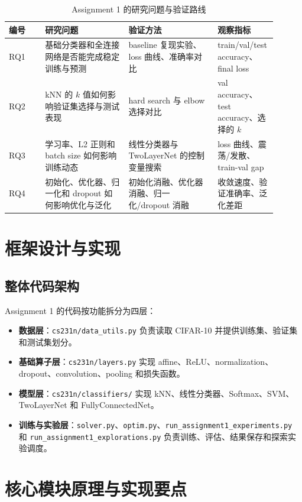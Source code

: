 \documentclass[UTF8]{ctexart}
\begin{document}
\begin{table}[H]
\centering
\begin{tabular}{p{0.13\linewidth}p{0.30\linewidth}p{0.32\linewidth}p{0.15\linewidth}}
\toprule
编号 & 研究问题 & 验证方法 & 观察指标 \\
\midrule
RQ1 & 基础分类器和全连接网络是否能完成稳定训练与预测 & baseline 复现实验、loss 曲线、准确率对比 & train/val/test accuracy、final loss \\
RQ2 & kNN 的 $k$ 值如何影响验证集选择与测试表现 & hard search 与 elbow 选择对比 & val accuracy、test accuracy、选择的 $k$ \\
RQ3 & 学习率、L2 正则和 batch size 如何影响训练动态 & 线性分类器与 TwoLayerNet 的控制变量搜索 & loss 曲线、震荡/发散、train-val gap \\
RQ4 & 初始化、优化器、归一化和 dropout 如何影响优化与泛化 & 初始化消融、优化器消融、归一化/dropout 消融 & 收敛速度、验证准确率、泛化差距 \\
\bottomrule
\end{tabular}
\caption{Assignment 1 的研究问题与验证路线}
\end{table}

\section{框架设计与实现}

\subsection{整体代码架构}

Assignment 1 的代码按功能拆分为四层：
\begin{itemize}
  \item \textbf{数据层}：\texttt{cs231n/data\_utils.py} 负责读取 CIFAR-10 并提供训练集、验证集和测试集划分。
  \item \textbf{基础算子层}：\texttt{cs231n/layers.py} 实现 affine、ReLU、normalization、dropout、convolution、pooling 和损失函数。
  \item \textbf{模型层}：\texttt{cs231n/classifiers/} 实现 kNN、线性分类器、Softmax、SVM、TwoLayerNet 和 FullyConnectedNet。
  \item \textbf{训练与实验层}：\texttt{solver.py}、\texttt{optim.py}、\texttt{run\_assignment1\_experiments.py} 和 \texttt{run\_assignment1\_explorations.py} 负责训练、评估、结果保存和探索实验调度。
\end{itemize}

\section{核心模块原理与实现要点}
\end{document}
